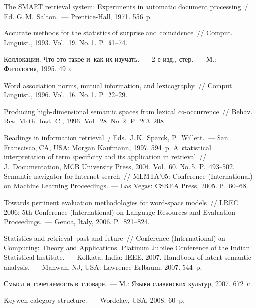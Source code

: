 \begin{multicols}{2}
{{\begin{thebibliography}{99}
The SMART retrieval system: Experiments in automatic document processing~/
Ed. G.\,M.~Salton.~--- Prentice-Hall, 1971. 556~p.

 Accurate methods for the statistics of surprise and coincidence~//
Comput. Linguist., 1993. Vol.~19. No.\,1. P.~61--74.

 Коллокации. Что это такое и~как их изучать.~---  2-е изд.,
стер.~--- М.: Филология, 1995. 49~с.

 Word association norms, mutual information, and
lexicography~// Comput. Linguist., 1996. Vol.~16. No.\,1. P.~22--29.

 Producing high-dimensional semantic spaces from
lexical co-occurrence~// Behav. Res. Meth. Inst. C.,
1996. Vol.~28. No.\,2. P.~203--208.

Readings in information retrieval~/
Eds.\ J.\,K.~Sp$\ddot{\mbox{a}}$rck, P.~Willett.~--- San Franscisco, CA, USA:
Morgan Kaufmann, 1997. 594~p.
 A~statistical interpretation of term
specificity and its application in retrieval~// J.~Documentation, MCB University
Press, 2004. Vol.~60. No.\,5. P.~493--502.
 Semantic navigator for
Internet search~// MLMTA'05: Conference (International) on Machine Learning
Proceedings.~--- Las Vegas: CSREA Press, 2005. P.~60--68.

 Towards pertinent evaluation methodologies for word-space
models~// LREC 2006: 5th Conference (International) on Language Resources and
Evaluation Proceedings.~--- Genoa, Italy, 2006. P.~821--824.

 Statistics and retrieval: past and future~//
Conference (International) on Computing: Theory and Applications. Platinum
Jubilee Conference of the Indian Statistical Institute.~--- Kolkata, India: IEEE,
2007.
 Handbook of
latent semantic analysis.~--- Mahwah, NJ, USA: Lawrence Erlbaum, 2007. 544~p.

 Смысл и~со\-че\-та\-емость в~словаре.~---
М.: Языки славянских культур, 2007. 672~с.

 Keywen category structure.~--- Wordclay, USA,
2008. 60~p.


\end{thebibliography}}}
\end{multicols}
